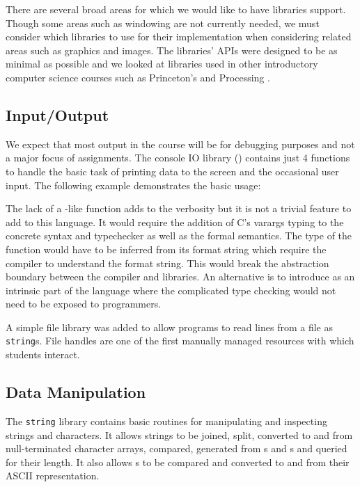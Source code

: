 There are several broad areas for which we would like to have libraries
support. Though some areas such as windowing are not currently needed, we must
consider which libraries to use for their implementation when considering
related areas such as graphics and images. The libraries' APIs were designed to
be as minimal as possible and we looked at libraries used in other introductory
computer science courses such as Princeton's \cite{PrincetonJavaLibs} and
Processing \cite{Processing}.

\subsection{Input/Output}

We expect that most output in the course will be for debugging purposes and not
a major focus of assignments. The console IO library () contains
just 4 functions to handle the basic task of printing data to the screen and
the occasional user input. The following example demonstrates the basic usage:


The lack of a -like function adds to the verbosity but it is not a
trivial feature to add to this language. It would require the addition of C's
varargs typing to the concrete syntax and typechecker as well as the formal
semantics. The type of the function would have to be inferred from its format
string which require the compiler to understand the format string. This would
break the abstraction boundary between the compiler and libraries. An
alternative is to introduce  as an intrinsic part of the
language where the complicated type checking would not need to be exposed to
programmers.

A simple file library was added to allow programs to read lines from a file as
{\tt string}s. File handles are one of the first manually managed resources
with which students interact.

\subsection{Data Manipulation}

The {\tt string} library contains basic routines for manipulating and inspecting
strings and characters. It allows strings to be joined, split, converted to and
from null-terminated character arrays, compared, generated from s
and s and queried for their length.  It also allows
s to be compared and converted to and from their ASCII
representation.

